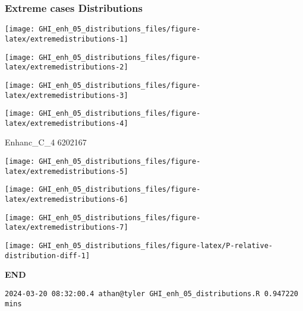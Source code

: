 \documentclass[
  10pt,
  a4paper,oneside]{article}
\begin{document}
\hypertarget{extreme-cases-distributions}{%
\subsubsection{Extreme cases Distributions}\label{extreme-cases-distributions}}

\begin{center}\texttt{[image: GHI\_enh\_05\_distributions\_files/figure-latex/extremedistributions-1]} \end{center}

\begin{center}\texttt{[image: GHI\_enh\_05\_distributions\_files/figure-latex/extremedistributions-2]} \end{center}

\begin{center}\texttt{[image: GHI\_enh\_05\_distributions\_files/figure-latex/extremedistributions-3]} \end{center}

\begin{center}\texttt{[image: GHI\_enh\_05\_distributions\_files/figure-latex/extremedistributions-4]} \end{center}

Enhanc\_C\_4
6202167

\begin{center}\texttt{[image: GHI\_enh\_05\_distributions\_files/figure-latex/extremedistributions-5]} \end{center}

\begin{center}\texttt{[image: GHI\_enh\_05\_distributions\_files/figure-latex/extremedistributions-6]} \end{center}

\begin{center}\texttt{[image: GHI\_enh\_05\_distributions\_files/figure-latex/extremedistributions-7]} \end{center}

\begin{center}\texttt{[image: GHI\_enh\_05\_distributions\_files/figure-latex/P-relative-distribution-diff-1]} \end{center}

\textbf{END}

\begin{verbatim}
2024-03-20 08:32:00.4 athan@tyler GHI_enh_05_distributions.R 0.947220 mins
\end{verbatim}
\end{document}
